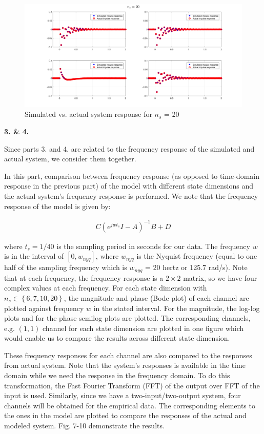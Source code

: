 \documentclass[paper=US leter, fontsize=11pt]{scrartcl}
\begin{document}
\begin{figure}[ht!]  
	\centering     
	\includegraphics[scale=0.4,trim={5cm 0 0 0},clip]{task124.png}  
	\caption{Simulated vs. actual system response for $n_{s}$ = 20}
	\label{task124} 
\end{figure} 
\clearpage
\textbf{3. \& 4.}

Since parts 3. and 4. are related to the frequency response of the simulated and actual system, we consider them together. 

In this part, comparison between frequency response (as opposed to time-domain response in the previous part) of the model with different state dimensions and the actual system's frequency response is performed. We note that the frequency response of the model is given by:

\begin{gather}
C(e^{jwt_{s}}I-A)^{-1}B+D
\end{gather}

where $t_{s} = 1/40$ is the sampling period in seconds for our data. The frequency $w$ is in the interval of $[0,w_{nyq}]$, where $w_{nyq}$ is the Nyquist frequency (equal to one half of the sampling frequency which is $w_{nyq}$ = 20 hertz or 125.7 rad/s). Note that at each frequency, the frequency response is a $2\times2$ matrix, so we have four complex values at each frequency. For each state dimension with $n_{s} \in \left\{6,7,10,20\right\}$, the magnitude and phase (Bode plot) of each channel are plotted against frequency $w$ in the stated interval. For the magnitude, the log-log plots and for the phase semilog plots are plotted. The corresponding channels, e.g. $(1,1)$ channel for each state dimension are plotted in one figure which would enable us to compare the results across different state dimension.

These frequency responses for each channel are also compared to the responses from actual system. Note that the system's responses is available in the time domain while we need the response in the frequency domain. To do this transformation, the Fast Fourier Transform (FFT) of the output over FFT of the input is used. Similarly, since we have a two-input/two-output system, four channels will be obtained for the empirical data. The corresponding elements to the ones in the model are plotted to compare the responses of the actual and modeled system. Fig. 7-10 demonstrate the results.
\end{document}
